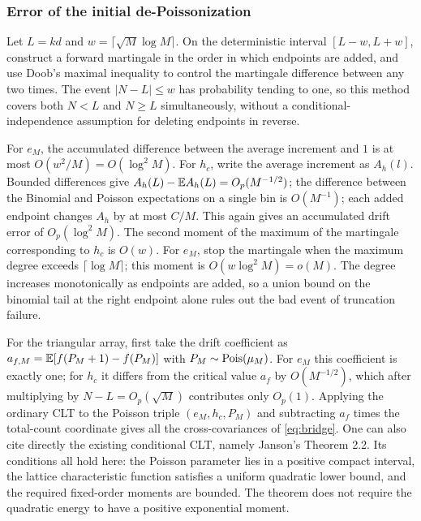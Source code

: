 \subsubsection{Error of the initial de-Poissonization}
Let $L=kd$ and $w=\lceil\sqrt M\log M\rceil$. On the deterministic interval $[L-w,L+w]$, construct a forward
martingale in the order in which endpoints are added, and use Doob's maximal inequality to control the
martingale difference between any two times. The event $|N-L|\le w$ has probability tending to one, so this
method covers both $N<L$ and $N\ge L$ simultaneously, without a conditional-independence assumption for
deleting endpoints in reverse.

For $e_M$, the accumulated difference between the average increment and $1$ is at most
$O(w^2/M)=O(\log^2 M)$. For $h_c$, write the average increment as $A_h(l)$. Bounded differences give
$A_h(L)-\mathbb E A_h(L)=O_p(M^{-1/2})$; the difference between the Binomial and Poisson expectations on a single
bin is $O(M^{-1})$; each added endpoint changes $A_h$ by at most $C/M$. This again gives an accumulated
drift error of $O_p(\log^2M)$. The second moment of the maximum of the martingale corresponding to $h_c$ is
$O(w)$. For $e_M$, stop the martingale when the maximum degree exceeds $\lceil\log M\rceil$; this moment is
$O(w\log^2M)=o(M)$. The degree increases monotonically as endpoints are added, so a union bound on the
binomial tail at the right endpoint alone rules out the bad event of truncation failure.

For the triangular array, first take the drift coefficient as $a_{f,M}=\mathbb E[f(P_M+1)-f(P_M)]$ with
$P_M\sim\operatorname{Pois}(\mu_M)$. For $e_M$ this coefficient is exactly one; for $h_c$ it differs from the critical
value $a_f$ by $O(M^{-1/2})$, which after multiplying by $N-L=O_p(\sqrt M)$ contributes only $O_p(1)$.
Applying the ordinary CLT to the Poisson triple $(e_M,h_c,P_M)$ and subtracting $a_f$ times the total-count
coordinate gives all the cross-covariances of \eqref{eq:bridge}. One can also cite directly the existing
conditional CLT, namely Janson's Theorem 2.2\cite{janson2001}. Its conditions all hold here: the Poisson
parameter lies in a positive compact interval, the lattice characteristic function satisfies a uniform
quadratic lower bound, and the required fixed-order moments are bounded. The theorem does not require the
quadratic energy to have a positive exponential moment.

